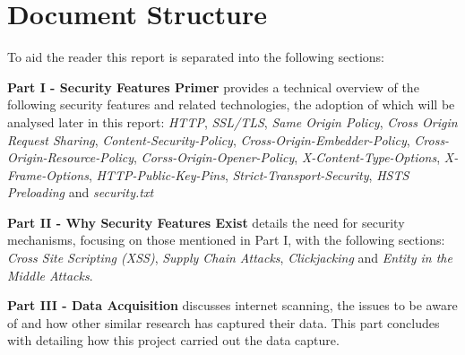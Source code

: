 \documentclass{mscreport}
\begin{document}
\newpage

\section{Document Structure}
\label{section:doc_struct}

To aid the reader this report is separated into the following sections:

\vspace{0.3cm} \noindent
\textbf{Part I - Security Features Primer} provides a technical overview of the following security features and related technologies, the adoption of which will be analysed later in this report: \textit{HTTP}, \textit{SSL/TLS}, \textit{Same Origin Policy}, \textit{Cross Origin Request Sharing}, \textit{Content-Security-Policy}, \textit{Cross-Origin-Embedder-Policy}, \textit{Cross-Origin-Resource-Policy}, \textit{Corss-Origin-Opener-Policy}, \textit{X-Content-Type-Options}, \textit{X-Frame-Options}, \textit{HTTP-Public-Key-Pins}, \textit{Strict-Transport-Security}, \textit{HSTS Preloading} and \textit{security.txt}

\vspace{0.3cm} \noindent
\textbf{Part II - Why Security Features Exist} details the need for security mechanisms, focusing on those mentioned in Part I, with the following sections: \textit{Cross Site Scripting (XSS)}, \textit{Supply Chain Attacks}, \textit{Clickjacking} and \textit{Entity in the Middle Attacks}.

\vspace{0.3cm} \noindent
\textbf{Part III - Data Acquisition} discusses internet scanning, the issues to be aware of and how other similar research has captured their data. This part concludes with detailing how this project carried out the data capture.
\end{document}
